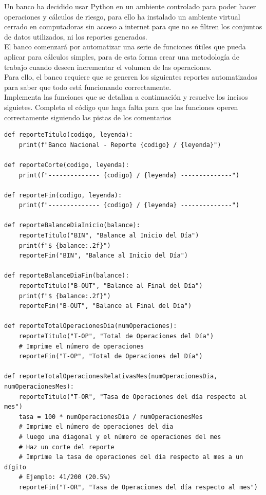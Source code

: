 \documentclass{article}
\begin{document}
Un banco ha decidido usar Python en un ambiente controlado para poder hacer operaciones y cálculos de riesgo, para ello ha instalado un ambiente virtual cerrado en computadoras sin acceso a internet para que no se filtren los conjuntos de datos utilizados, ni los reportes generados.
\\[12pt]
El banco comenzará por automatizar una serie de funciones útiles que pueda aplicar para cálculos simples, para de esta forma crear una metodología de trabajo cuando deseen incrementar el volumen de las operaciones.
\\[12pt]
Para ello, el banco requiere que se generen los siguientes reportes automatizados para saber que todo está funcionando correctamente.
\\[12pt]
Implementa las funciones que se detallan a continuación y resuelve los incisos siguietes. Completa el código que haga falta para que las funciones operen correctamente siguiendo las pistas de los comentarios
\scriptsize
\begin{verbatim}
def reporteTitulo(codigo, leyenda):
    print(f"Banco Nacional - Reporte {codigo} / {leyenda}")

def reporteCorte(codigo, leyenda):
    print(f"-------------- {codigo} / {leyenda} --------------")

def reporteFin(codigo, leyenda):
    print(f"-------------- {codigo} / {leyenda} --------------")

def reporteBalanceDiaInicio(balance):
    reporteTitulo("BIN", "Balance al Inicio del Día")
    print(f"$ {balance:.2f}")
    reporteFin("BIN", "Balance al Inicio del Día")

def reporteBalanceDiaFin(balance):
    reporteTitulo("B-OUT", "Balance al Final del Día")
    print(f"$ {balance:.2f}")
    reporteFin("B-OUT", "Balance al Final del Día")

def reporteTotalOperacionesDia(numOperaciones):
    reporteTitulo("T-OP", "Total de Operaciones del Día")
    # Imprime el número de operaciones
    reporteFin("T-OP", "Total de Operaciones del Día")

def reporteTotalOperacionesRelativasMes(numOperacionesDia, numOperacionesMes):
    reporteTitulo("T-OR", "Tasa de Operaciones del día respecto al mes")
    tasa = 100 * numOperacionesDia / numOperacionesMes
    # Imprime el número de operaciones del dia
    # luego una diagonal y el número de operaciones del mes
    # Haz un corte del reporte
    # Imprime la tasa de operaciones del día respecto al mes a un dígito
    # Ejemplo: 41/200 (20.5%)
    reporteFin("T-OR", "Tasa de Operaciones del día respecto al mes")
\end{verbatim}
\hfill
\normalsize
\end{document}
